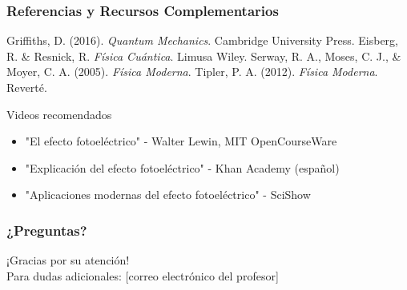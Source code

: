 \documentclass{beamer}
\begin{document}
	\begin{frame}
		\frametitle{Referencias y Recursos Complementarios}
		\begin{thebibliography}{99}
			 Griffiths, D. (2016). \textit{Quantum Mechanics}. Cambridge University Press.
			 Eisberg, R. \& Resnick, R. \textit{Física Cuántica}. Limusa Wiley.
			 Serway, R. A., Moses, C. J., \& Moyer, C. A. (2005). \textit{Física Moderna}.
			 Tipler, P. A. (2012). \textit{Física Moderna}. Reverté.
		\end{thebibliography}
		
		\begin{block}{Videos recomendados}
			\begin{itemize}
				\item "El efecto fotoeléctrico" - Walter Lewin, MIT OpenCourseWare
				\item "Explicación del efecto fotoeléctrico" - Khan Academy (español)
				\item "Aplicaciones modernas del efecto fotoeléctrico" - SciShow
			\end{itemize}
		\end{block}
	\end{frame}
	
	\begin{frame}
		\frametitle{¿Preguntas?}
		\begin{center}
			\huge ¡Gracias por su atención!\\
			\vspace{1cm}
			\normalsize
			Para dudas adicionales: [correo electrónico del profesor]
		\end{center}
	\end{frame}
	
\end{document}
